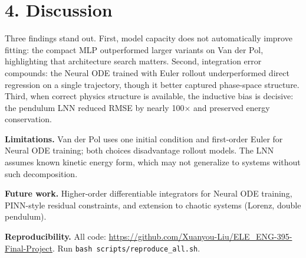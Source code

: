 \documentclass[10pt]{article}
\begin{document}
\section*{4. Discussion}

Three findings stand out.
First, model capacity does not automatically improve fitting: the compact MLP outperformed larger variants on Van der Pol, highlighting that architecture search matters.
Second, integration error compounds: the Neural ODE trained with Euler rollout underperformed direct regression on a single trajectory, though it better captured phase-space structure.
Third, when correct physics structure is available, the inductive bias is decisive: the pendulum LNN reduced RMSE by nearly 100$\times$ and preserved energy conservation.

\textbf{Limitations.}
Van der Pol uses one initial condition and first-order Euler for Neural ODE training; both choices disadvantage rollout models.
The LNN assumes known kinetic energy form, which may not generalize to systems without such decomposition.

\textbf{Future work.}
Higher-order differentiable integrators for Neural ODE training, PINN-style residual constraints, and extension to chaotic systems (Lorenz, double pendulum).

\textbf{Reproducibility.}
All code: \url{https://github.com/Xuanyou-Liu/ELE_ENG-395-Final-Project}. Run \texttt{bash scripts/reproduce\_all.sh}.
\end{document}
